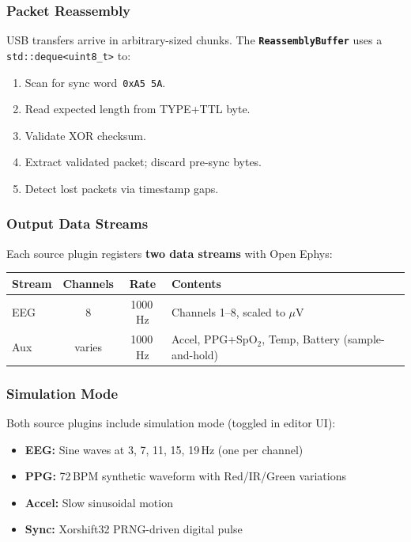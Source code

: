 \documentclass[11pt,a4paper]{article}
\newcommand{\component}[1]{\texttt{\textbf{#1}}}
\newcommand{\hex}[1]{\texttt{0x#1}}
\begin{document}
\subsubsection{Packet Reassembly}

USB transfers arrive in arbitrary-sized chunks.  The \component{Reassembly\-Buffer}
uses a \texttt{std::deque\allowbreak<uint8\_t>} to:

\begin{enumerate}
    \item Scan for sync word~\hex{A5\,5A}.
    \item Read expected length from TYPE+TTL byte.
    \item Validate XOR checksum.
    \item Extract validated packet; discard pre-sync bytes.
    \item Detect lost packets via timestamp gaps.
\end{enumerate}

\subsubsection{Output Data Streams}

Each source plugin registers \textbf{two data streams} with Open Ephys:

\begin{table}[H]
\centering
\begin{tabular}{l c c l}
\toprule
\textbf{Stream} & \textbf{Channels} & \textbf{Rate} & \textbf{Contents} \\
\midrule
EEG  & 8  & 1000\,Hz & Channels 1--8, scaled to $\mu$V \\
Aux  & varies & 1000\,Hz & Accel, PPG+SpO$_2$, Temp, Battery (sample-and-hold) \\
\bottomrule
\end{tabular}
\end{table}

\subsubsection{Simulation Mode}

Both source plugins include simulation mode (toggled in editor UI):

\begin{itemize}
    \item \textbf{EEG:} Sine waves at 3, 7, 11, 15, 19\,Hz (one per channel)
    \item \textbf{PPG:} 72\,BPM synthetic waveform with Red/IR/Green variations
    \item \textbf{Accel:} Slow sinusoidal motion
    \item \textbf{Sync:} Xorshift32 PRNG-driven digital pulse
\end{itemize}
\end{document}
